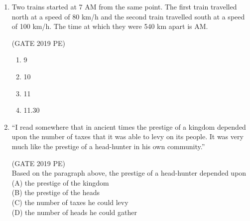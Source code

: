 \documentclass[journal,12pt,onecolumn]{exam}
\theoremstyle{remark}
\begin{document}
\begin{enumerate}
    \item Two trains started at 7 AM from the same point. The first train travelled north at a speed of 80 km/h and the second train travelled south at a speed of 100 km/h. The time at which they were 540 km apart is AM.
    
    \hfill{(GATE 2019 PE)}\\
\begin{enumerate}
    \item 9
    \item 10
    \item 11
    \item 11.30
\end{enumerate}

    \item ``I read somewhere that in ancient times the prestige of a kingdom depended upon the number of taxes that it was able to levy on its people. It was very much like the prestige of a head-hunter in his own community.''
    
    \hfill{(GATE 2019 PE)}\\
    Based on the paragraph above, the prestige of a head-hunter depended upon\\
    (A) the prestige of the kingdom\\
    (B) the prestige of the heads\\
    (C) the number of taxes he could levy\\
    (D) the number of heads he could gather
\end{enumerate}
\end{document}
